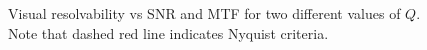 \documentclass[]{spieman}  %
\begin{document}
\begin{figure}%
	\centering
	\label{fig:snr_mtf}
	\caption{Visual resolvability vs SNR and MTF for two different values of $Q$.  Note that dashed red line indicates Nyquist criteria.}
\end{figure}
\end{document}
